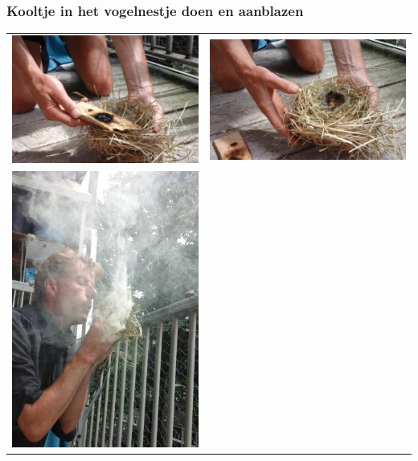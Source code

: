 \documentclass[a4paper, handout]{beamer}
\begin{document}
\begin{frame}
	\frametitle{Kooltje in het vogelnestje doen en aanblazen}
	\begin{tabular}{ c c }
		\includegraphics[height=0.40\textheight]{blazen-1}
		&
		\includegraphics[height=0.40\textheight]{blazen-2}
		\\
		\includegraphics[height=0.40\textheight]{blazen-3}

\end{tabular}
\end{frame}
\end{document}
